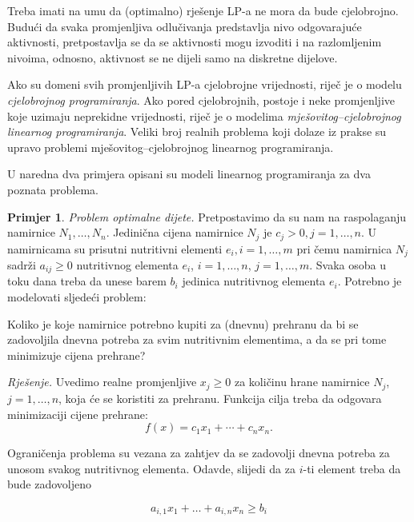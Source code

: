 \documentclass[b5paper, utf8, 11pt, colorlinks]{book}
\theoremstyle{definition}
\newtheorem{primjer}{Primjer}[chapter]
\begin{document}
Treba imati na umu da (optimalno) rješenje LP-a ne mora da bude cjelobrojno. Budući da svaka promjenljiva odlučivanja predstavlja nivo odgovarajuće aktivnosti, pretpostavlja se da se aktivnosti mogu izvoditi i na razlomljenim nivoima, odnosno, aktivnost  se ne dijeli samo na diskretne dijelove. 

Ako su domeni svih promjenljivih LP-a cjelobrojne vrijednosti, riječ je o modelu \emph{cjelobrojnog programiranja}. Ako pored cjelobrojnih, postoje i neke promjenljive koje uzimaju neprekidne vrijednosti, riječ je o modelima \emph{mješovitog--cjelobrojnog linearnog programiranja}. Veliki broj realnih problema koji dolaze iz prakse su upravo problemi mješovitog--cjelobrojnog linearnog programiranja.
 


U naredna dva primjera opisani su modeli linearnog programiranja za dva poznata problema. 

\begin{primjer}
\emph{Problem optimalne dijete.} Pretpostavimo da su nam na raspolaganju namirnice $N_1, \ldots, N_n$. Jedinična cijena namirnice $N_j$ je $c_j>0, j = 1, \ldots, n$. U namirnicama su prisutni nutritivni elementi $e_i,i=1,\ldots,m$ pri čemu
namirnica $N_j$ sadrži $a_{ij} \geq 0$ nutritivnog elementa $e_i$, $i = 1, \ldots, n$, $j = 1, \ldots, m$. Svaka osoba u toku dana treba da unese barem $b_i$
jedinica nutritivnog elementa $e_i$. Potrebno je modelovati
sljedeći problem: 

Koliko je koje namirnice potrebno kupiti za (dnevnu) prehranu da bi se zadovoljila dnevna
potreba za svim nutritivnim elementima, a da se pri tome minimizuje cijena prehrane?
\end{primjer}
 
 \emph{Rješenje.}  Uvedimo realne promjenljive $x_j \geq 0$ za količinu hrane namirnice $N_j$, $j = 1, \ldots, n$, koja će se koristiti za prehranu. Funkcija cilja treba da odgovara minimizaciji cijene prehrane:
 $$f(x) = c_1 x_1 + \cdots + c_n x_n.$$
 
 Ograničenja problema su vezana za zahtjev da se zadovolji dnevna potreba za unosom svakog nutritivnog elementa. Odavde, slijedi da za $i$-ti element treba da bude zadovoljeno
 
 $$ a_{i,1} x_1 + \ldots + a_{i,n} x_n \geq b_i $$
 
\end{document}
